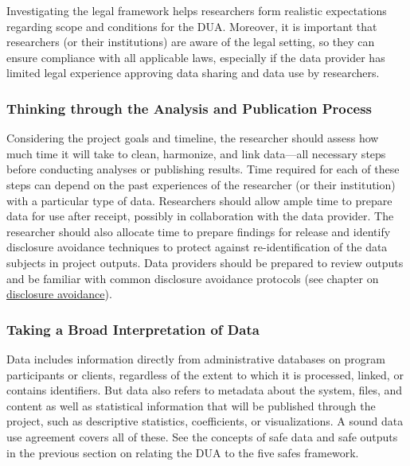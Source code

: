\documentclass[
]{WileySix}
\begin{document}
Investigating the legal framework helps researchers form realistic expectations regarding scope and conditions for the DUA. Moreover, it is important that researchers (or their institutions) are aware of the legal setting, so they can ensure compliance with all applicable laws, especially if the data provider has limited legal experience approving data sharing and data use by researchers.

\hypertarget{thinking-through-the-analysis-and-publication-process}{%
\subsubsection{Thinking through the Analysis and Publication Process}\label{thinking-through-the-analysis-and-publication-process}}

Considering the project goals and timeline, the researcher should assess how much time it will take to clean, harmonize, and link data---all necessary steps before conducting analyses or publishing results. Time required for each of these steps can depend on the past experiences of the researcher (or their institution) with a particular type of data. Researchers should allow ample time to prepare data for use after receipt, possibly in collaboration with the data provider. The researcher should also allocate time to prepare findings for release and identify disclosure avoidance techniques to protect against re-identification of the data subjects in project outputs. Data providers should be prepared to review outputs and be familiar with common disclosure avoidance protocols (see chapter on \protect\hyperlink{discavoid}{disclosure avoidance}).

\hypertarget{taking-a-broad-interpretation-of-data}{%
\subsubsection{Taking a Broad Interpretation of Data}\label{taking-a-broad-interpretation-of-data}}

Data includes information directly from administrative databases on program participants or clients, regardless of the extent to which it is processed, linked, or contains identifiers. But data also refers to metadata about the system, files, and content as well as statistical information that will be published through the project, such as descriptive statistics, coefficients, or visualizations. A sound data use agreement covers all of these. See the concepts of safe data and safe outputs in the previous section on relating the DUA to the five safes framework.
\end{document}
